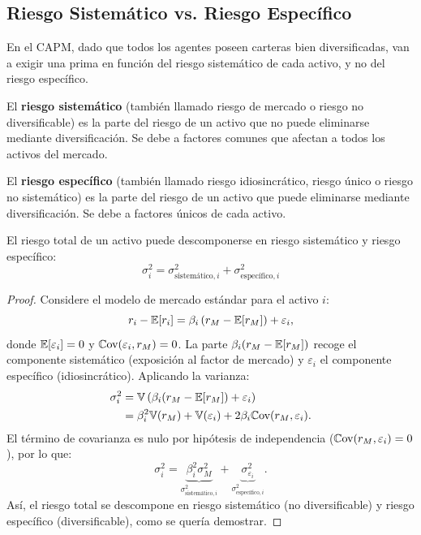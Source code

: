 \subsection{Riesgo Sistemático vs. Riesgo Específico}

En el CAPM, dado que todos los agentes poseen carteras bien diversificadas, van a exigir una prima en función del riesgo sistemático de cada activo, y no del riesgo específico.

\begin{definicion}
El \textbf{riesgo sistemático} (también llamado riesgo de mercado o riesgo no diversificable) es la parte del riesgo de un activo que no puede eliminarse mediante diversificación. Se debe a factores comunes que afectan a todos los activos del mercado.
\end{definicion}

\begin{definicion}
El \textbf{riesgo específico} (también llamado riesgo idiosincrático, riesgo único o riesgo no sistemático) es la parte del riesgo de un activo que puede eliminarse mediante diversificación. Se debe a factores únicos de cada activo.
\end{definicion}

\begin{teorema}
El riesgo total de un activo puede descomponerse en riesgo sistemático y riesgo específico:
\begin{equation}
\sigma_i^2 = \sigma_{\text{sistemático},i}^2 + \sigma_{\text{específico},i}^2
\end{equation}
\end{teorema}

\begin{proof}
Considere el modelo de mercado estándar para el activo $i$:
\begin{equation*}
r_i - \mathbb{E}[r_i] = \beta_i \left(r_M - \mathbb{E}[r_M]\right) + \varepsilon_i,
\end{equation*}
donde $\mathbb{E}[\varepsilon_i] = 0$ y $\mathbb{C}\text{ov}(\varepsilon_i, r_M) = 0$. La parte $\beta_i(r_M - \mathbb{E}[r_M])$ recoge el componente sistemático (exposición al factor de mercado) y $\varepsilon_i$ el componente específico (idiosincrático). Aplicando la varianza:
\begin{align*}
\sigma_i^2 &= \mathbb{V}\left(\beta_i (r_M - \mathbb{E}[r_M]) + \varepsilon_i\right) \\
&= \beta_i^2 \mathbb{V}(r_M) + \mathbb{V}(\varepsilon_i) + 2\beta_i \mathbb{C}\text{ov}(r_M, \varepsilon_i).
\end{align*}
El término de covarianza es nulo por hipótesis de independencia ($\mathbb{C}\text{ov}(r_M, \varepsilon_i) = 0$), por lo que:
\begin{equation*}
\sigma_i^2 = \underbrace{\beta_i^2 \sigma_M^2}_{\sigma_{\text{sistemático},i}^2} + \underbrace{\sigma_{\varepsilon_i}^2}_{\sigma_{\text{específico},i}^2}.
\end{equation*}
Así, el riesgo total se descompone en riesgo sistemático (no diversificable) y riesgo específico (diversificable), como se quería demostrar.
\end{proof}

